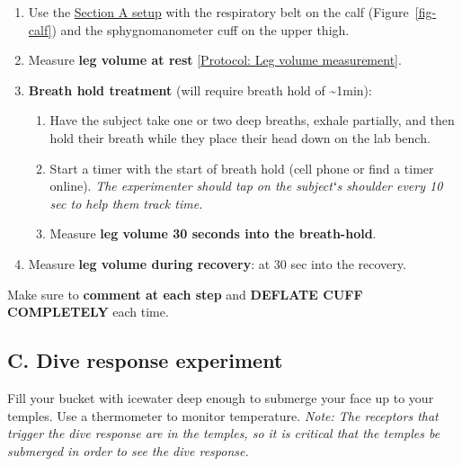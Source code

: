 \documentclass[
  letterpaper,
  DIV=11,
  numbers=noendperiod,
  oneside]{scrartcl}
\providecommand{\tightlist}{%
  \setlength{\itemsep}{0pt}\setlength{\parskip}{0pt}}\usepackage{longtable,booktabs,array}
\begin{document}
\begin{enumerate}
\def\labelenumi{\arabic{enumi}.}
\tightlist
\item
  Use the \href{@sec-divesetup}{Section A setup} with the respiratory
  belt on the calf (Figure~\ref{fig-calf}) and the sphygnomanometer cuff
  on the upper thigh.
\item
  Measure \textbf{leg volume at rest} {[}\href{@prot-legvol}{Protocol:
  Leg volume measurement}{]}.\\
\item
  \textbf{Breath hold treatment} (will require breath hold of
  \textasciitilde1min):

  \begin{enumerate}
  \def\labelenumii{\alph{enumii}.}
  \tightlist
  \item
    Have the subject take one or two deep breaths, exhale partially, and
    then hold their breath while they place their head down on the lab
    bench.\\
  \item
    Start a timer with the start of breath hold (cell phone or find a
    timer online). \emph{The experimenter should tap on the subjectʻs
    shoulder every 10 sec to help them track time.}
  \item
    Measure \textbf{leg volume 30 seconds into the breath-hold}.\\
  \end{enumerate}
\item
  Measure \textbf{leg volume during recovery}: at 30 sec into the
  recovery.
\end{enumerate}

{Make sure to \textbf{comment at each step} and \textbf{DEFLATE CUFF
COMPLETELY} each time.}

\hypertarget{c.-dive-response-experiment}{%
\subsection{C. Dive response
experiment}\label{c.-dive-response-experiment}}

Fill your bucket with icewater deep enough to submerge your face up to
your temples. Use a thermometer to monitor temperature. \emph{Note: The
receptors that trigger the dive response are in the temples, so it is
critical that the temples be submerged in order to see the dive
response.}
\end{document}
